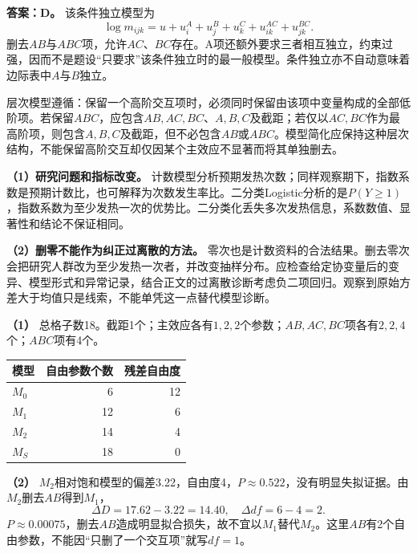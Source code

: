 
\textbf{答案：D。} 该条件独立模型为
\[\log m_{ijk}=u+u_i^A+u_j^B+u_k^C+u_{ik}^{AC}+u_{jk}^{BC}.\]
删去\(AB\)与\(ABC\)项，允许\(AC\)、\(BC\)存在。A项还额外要求三者相互独立，约束过强，因而不是题设“只要求”该条件独立时的最一般模型。条件独立亦不自动意味着边际表中\(A\)与\(B\)独立。




层次模型遵循：保留一个高阶交互项时，必须同时保留由该项中变量构成的全部低阶项。若保留\(ABC\)，应包含\(AB,AC,BC\)、\(A,B,C\)及截距；若仅以\(AC,BC\)作为最高阶项，则包含\(A,B,C\)及截距，但不必包含\(AB\)或\(ABC\)。模型简化应保持这种层次结构，不能保留高阶交互却仅因某个主效应不显著而将其单独删去。




\textbf{（1）研究问题和指标改变。} 计数模型分析预期发热次数；同样观察期下，指数系数是预期计数比，也可解释为次数发生率比。二分类Logistic分析的是\(P(Y\ge1)\)，指数系数为至少发热一次的优势比。二分类化丢失多次发热信息，系数数值、显著性和结论不保证相同。

\textbf{（2）删零不能作为纠正过离散的方法。} 零次也是计数资料的合法结果。删去零次会把研究人群改为至少发热一次者，并改变抽样分布。应检查给定协变量后的变异、模型形式和异常记录，结合正文的过离散诊断考虑负二项回归。观察到原始方差大于均值只是线索，不能单凭这一点替代模型诊断。




\textbf{（1）} 总格子数18。截距1个；主效应各有\(1,2,2\)个参数；\(AB,AC,BC\)项各有\(2,2,4\)个；\(ABC\)项有4个。
\begin{center}\begin{tabular}{lrr}\toprule
模型 & 自由参数个数 & 残差自由度\\\midrule
\(M_0\) & 6 & 12\\
\(M_1\) & 12 & 6\\
\(M_2\) & 14 & 4\\
\(M_S\) & 18 & 0\\\bottomrule
\end{tabular}\end{center}
\textbf{（2）} \(M_2\)相对饱和模型的偏差3.22，自由度4，\(P\approx0.522\)，没有明显失拟证据。由\(M_2\)删去\(AB\)得到\(M_1\)，
\[\Delta D=17.62-3.22=14.40,\quad\Delta df=6-4=2.\]
\(P\approx0.00075\)，删去\(AB\)造成明显拟合损失，故不宜以\(M_1\)替代\(M_2\)。这里\(AB\)有2个自由参数，不能因“只删了一个交互项”就写\(df=1\)。


